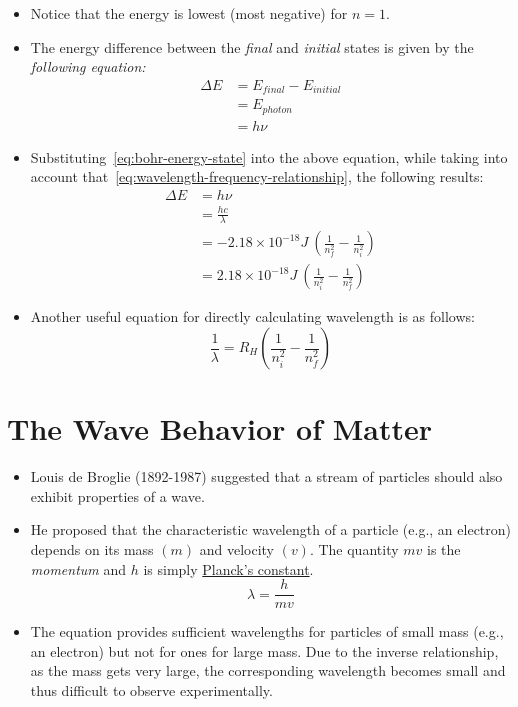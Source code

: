 \documentclass[
	chapter=7,
	title={Quantum Theory {\&} the Electronic Structure of Atoms},
	showanswers=true,
]{chem122notes}
\begin{document}
\begin{itemize}
	\item Notice that the energy is lowest (most negative) for $n = 1$.
	\item The energy difference between the \textit{final} and \textit{initial} states is given by the \emph{following equation:}
	\begin{equation}
		\begin{aligned}
			\Delta E &= E_{final} - E_{initial}\\
			&= E_{photon}\\
			&= h\nu
		\end{aligned}
		\label{eq:electronic-transition-difference}
	\end{equation}
	\item Substituting~\eqref{eq:bohr-energy-state} into the above equation, while taking into account that~\eqref{eq:wavelength-frequency-relationship}, the following results:
	\begin{equation}
		\begin{aligned}
			\Delta E &= h\nu\\
			&= \frac{hc}{\lambda}\\
			&= -2.18 \times 10^{-18} J\ \left( \frac{1}{n_{f}^{2}} - \frac{1}{n_{i}^{2}} \right)\\
			&= 2.18 \times 10^{-18} J\ \left( \frac{1}{n_{i}^{2}} - \frac{1}{n_{f}^{2}} \right)
		\end{aligned}
		\label{eq:electron-transition}
	\end{equation}
	\item Another useful equation for directly calculating wavelength is as follows:
	\begin{equation}
		\frac{1}{\lambda} = R_{H}\left( \frac{1}{n_{i}^{2}} - \frac{1}{n_{f}^{2}} \right)
		\label{eq:wavelength-rydberg}
	\end{equation}
\end{itemize}

\section{The Wave Behavior of Matter}\label{sec:the-wave-behavior-of-matter}
\begin{itemize}
	\item Louis de Broglie (1892-1987) suggested that a stream of particles should also exhibit properties of a wave.
	\item He proposed that the characteristic wavelength of a particle (e.g., an electron) depends on its mass $(m)$ and velocity $(v)$.
	The quantity $mv$ is the \emph{momentum} and $h$ is simply \hyperref[dfn:plancks-constant]{Planck's constant}.
	\begin{equation}
		\lambda = \frac{h}{mv}
		\label{eq:wave-behavior-of-matter}
	\end{equation}
	\item The equation provides sufficient wavelengths for particles of small mass (e.g., an electron) but not for ones for large mass.
	Due to the inverse relationship, as the mass gets very large, the corresponding wavelength becomes small and thus difficult to observe experimentally.
\end{itemize}
\end{document}
